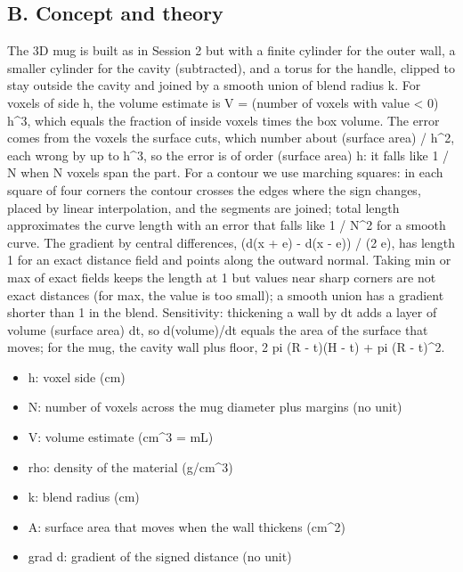 \documentclass[11pt,a4paper]{article}
\begin{document}
\subsection*{B. Concept and theory}
The 3D mug is built as in Session 2 but with a finite cylinder for the outer wall, a smaller cylinder for the cavity (subtracted), and a torus for the handle, clipped to stay outside the cavity and joined by a smooth union of blend radius k. For voxels of side h, the volume estimate is V = (number of voxels with value \textless{} 0) h\textasciicircum{}3, which equals the fraction of inside voxels times the box volume. The error comes from the voxels the surface cuts, which number about (surface area) / h\textasciicircum{}2, each wrong by up to h\textasciicircum{}3, so the error is of order (surface area) h: it falls like 1 / N when N voxels span the part. For a contour we use marching squares: in each square of four corners the contour crosses the edges where the sign changes, placed by linear interpolation, and the segments are joined; total length approximates the curve length with an error that falls like 1 / N\textasciicircum{}2 for a smooth curve. The gradient by central differences, (d(x + e) - d(x - e)) / (2 e), has length 1 for an exact distance field and points along the outward normal. Taking min or max of exact fields keeps the length at 1 but values near sharp corners are not exact distances (for max, the value is too small); a smooth union has a gradient shorter than 1 in the blend. Sensitivity: thickening a wall by dt adds a layer of volume (surface area) dt, so d(volume)/dt equals the area of the surface that moves; for the mug, the cavity wall plus floor, 2 pi (R - t)(H - t) + pi (R - t)\textasciicircum{}2.

\begin{itemize}[nosep]
\item h: voxel side (cm)
\item N: number of voxels across the mug diameter plus margins (no unit)
\item V: volume estimate (cm\textasciicircum{}3 = mL)
\item rho: density of the material (g/cm\textasciicircum{}3)
\item k: blend radius (cm)
\item A: surface area that moves when the wall thickens (cm\textasciicircum{}2)
\item grad d: gradient of the signed distance (no unit)
\end{itemize}
\end{document}
